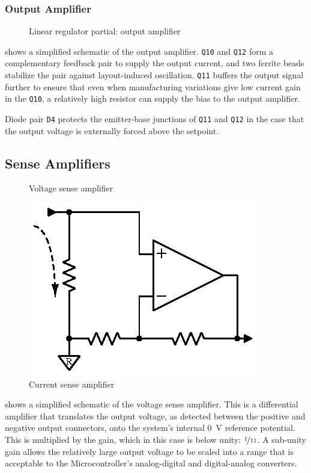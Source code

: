 \documentclass[a4paper,twocolumn,10pt,openany,oneside,final,fleqn]{memoir}
\newcommand{\rd}[1]{\texttt{#1}}
\newcommand{\xcircuit}[1]{ \centering \textsf{  } }
\begin{document}
\subsubsection{Output Amplifier}

\begin{figure}
\xcircuit{outamp}
\caption{Linear regulator partial: output amplifier}
\label{fig:outputamp}
\end{figure}

 shows a simplified schematic of the output amplifier. \rd{Q10}
and \rd{Q12} form a complementary feedback pair to supply the output current, and
two ferrite beads stabilize the pair against layout-induced oscillation. \rd{Q11}
buffers the output signal further to ensure that even when manufacturing variations
give low current gain in the \rd{Q10}, a relatively high resistor can supply the
bias to the output amplifier.

Diode pair \rd{D4} protects the emitter-base junctions of \rd{Q11} and \rd{Q12} in
the case that the output voltage is externally forced above the setpoint.

\subsection{Sense Amplifiers}

\begin{figure}
\xcircuit{vsense}
\caption{Voltage sense amplifier}
\label{fig:vsense}
\end{figure}

\begin{figure}
\centering
\includegraphics{isense}
\caption{Current sense amplifier}
\label{fig:isense}
\end{figure}

 shows a simplified schematic of the voltage sense amplifier. This
is a differential amplifier that translates the output voltage, as detected between
the positive and negative output connectors, onto the system's internal \SI{0}{V}
reference potential. This is multiplied by the gain, which in this case is below
unity: $\nicefrac{1}{11}$. A sub-unity gain allows the relatively large output voltage
to be scaled into a range that is acceptable to the Microcontroller's analog-digital
and digital-analog converters.
\end{document}
